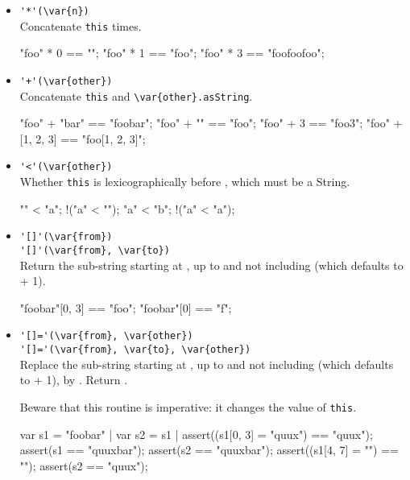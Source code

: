 \begin{itemize}
\item \lstinline|'*'(\var{n})|\\
  Concatenate \lstinline|this|  times.
\begin{urbiassert}
"foo" * 0 == "";
"foo" * 1 == "foo";
"foo" * 3 == "foofoofoo";
\end{urbiassert}

\item \lstinline|'+'(\var{other})|\\
  Concatenate \lstinline|this| and \lstinline|\var{other}.asString|.
\begin{urbiassert}
"foo" + "bar" == "foobar";
"foo" + "" == "foo";
"foo" + 3 == "foo3";
"foo" + [1, 2, 3] == "foo[1, 2, 3]";
\end{urbiassert}

\item \lstinline|'<'(\var{other})|\\
  Whether \lstinline|this| is lexicographically before ,
  which must be a String.
\begin{urbiassert}
"" < "a";
!("a" < "");
"a" < "b";
!("a" < "a");
\end{urbiassert}

\item \lstinline|'[]'(\var{from})|\\
  \lstinline|'[]'(\var{from}, \var{to})|\\
  Return the sub-string starting at , up to and not including
   (which defaults to  + 1).
\begin{urbiassert}
"foobar"[0, 3] == "foo";
"foobar"[0] == "f";
\end{urbiassert}

\item \lstinline|'[]='(\var{from}, \var{other})|\\
  \lstinline|'[]='(\var{from}, \var{to}, \var{other})|\\
  Replace the sub-string starting at , up to and not including
   (which defaults to  + 1), by .  Return
  .

  Beware that this routine is imperative: it changes the value of
  \lstinline|this|.
\begin{urbiscript}
var s1 = "foobar" | var s2 = s1 |
assert((s1[0, 3] = "quux") == "quux");
assert(s1 == "quuxbar");
assert(s2 == "quuxbar");
assert((s1[4, 7] = "") == "");
assert(s2 == "quux");
\end{urbiscript}
\end{itemize}

